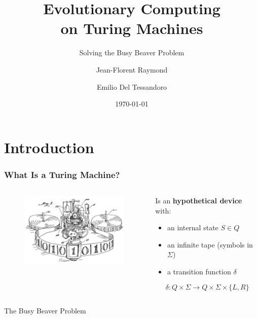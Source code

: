 \documentclass{beamer}
\title{\textbf{Evolutionary Computing \\on Turing Machines}}
\subtitle{Solving the Busy Beaver Problem}
\author{Jean-Florent Raymond \and Emilio Del Tessandoro}
\institute[Uppsala University]{Uppsala University}
\date{\today}
\begin{document}
{
	
	\begin{frame}
	\titlepage
	\end{frame}
}
\section{Introduction}

\begin{frame}
\frametitle{What Is a Turing Machine?}
\begin{columns}[c]
	\begin{column}{5.5cm}
		\begin{figure}
		\includegraphics[width=5.5cm]{figures/turingMachine.png}
		\end{figure}
	\end{column}
	\begin{column}{6cm}
		Is an \textbf{hypothetical device} with:
		\begin{itemize}
		\item an internal state $S \in Q$
		\item an infinite tape (symbols in $\Sigma$)
		\item a transition function $\delta$
		\end{itemize}
		
		\[\delta : Q \times \Sigma \to Q \times \Sigma \times \{L,R\}\]
	\end{column}
\end{columns}
\end{frame}


\begin{frame}{The Busy Beaver Problem}

\end{frame}
\end{document}
